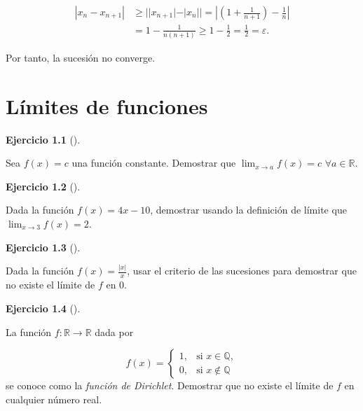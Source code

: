 \documentclass[
  a4paper,
]{scrreport}
\theoremstyle{definition}
\newtheorem{exercise}{Ejercicio}[chapter]
\theoremstyle{remark}
\begin{document}
\begin{tcolorbox}
\begin{align*}
|x_n-x_{n+1}| &\geq ||x_{n+1}|-|x_n|| =\left|\left(1+\frac{1}{n+1}\right)-\frac{1}{n}\right|\\ 
&=1-\frac{1}{n(n+1)}\geq 1 -\frac{1}{2} = \frac{1}{2}=\varepsilon.
\end{align*}

Por tanto, la sucesión no converge.

\end{tcolorbox}


\hypertarget{luxedmites-de-funciones}{%
\chapter{Límites de funciones}\label{luxedmites-de-funciones}}

\leavevmode{}%
\begin{exercise}[]\label{exr-funcion-constante}

Sea \(f(x)=c\) una función constante. Demostrar que
\(\lim_{x\to a}f(x)=c\) \(\forall a\in\mathbb{R}\).

\end{exercise}

\leavevmode{}%
\begin{exercise}[]\label{exr-definicion-limite}

Dada la función \(f(x)=4x-10\), demostrar usando la definición de límite
que \(\lim_{x\to 3}f(x)=2\).

\end{exercise}

\leavevmode{}%
\begin{exercise}[]\label{exr-limite-criterio-sucesiones}

Dada la función \(f(x)=\frac{|x|}{x}\), usar el criterio de las
sucesiones para demostrar que no existe el límite de \(f\) en \(0\).

\end{exercise}

\leavevmode{}%
\begin{exercise}[]\label{exr-limite-funcion-Dirichlet}

La función \(f:\mathbb{R}\to \mathbb{R}\) dada por

\[
f(x)=\begin{cases}
1, & \mbox{si } x\in\mathbb{Q},\\ 
0, & \mbox{si } x\not\in \mathbb{Q}
\end{cases}
\] se conoce como la \emph{función de Dirichlet}. Demostrar que no
existe el límite de \(f\) en cualquier número real.

\end{exercise}
\end{document}
